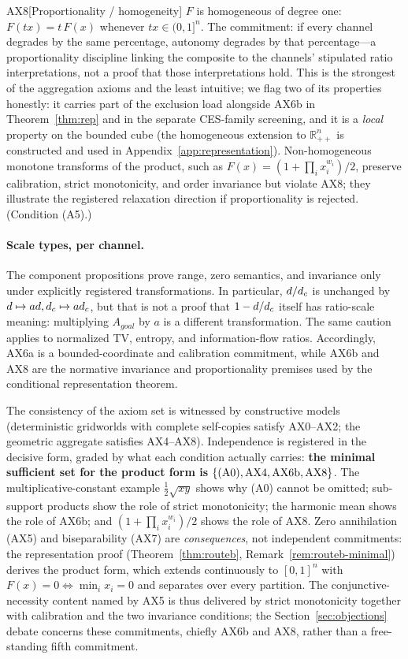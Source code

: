 \begin{axiom}{AX8}[Proportionality / homogeneity]\label{ax:8}
$F$ is homogeneous of degree one: $F(tx)=t\,F(x)$ whenever $tx\in(0,1]^n$. The
commitment: if every channel degrades by the same percentage, autonomy
degrades by that percentage---a proportionality discipline linking the
composite to the channels' stipulated ratio interpretations, not a proof
that those interpretations hold. This is the strongest of the
aggregation axioms and the least intuitive; we flag two of its properties
honestly: it carries part of the exclusion load alongside AX6b in
Theorem~\ref{thm:rep} and in the separate CES-family screening, and it is a
\emph{local} property on the bounded cube
(the homogeneous extension to $\mathbb{R}_{++}^n$ is constructed and used in
Appendix~\ref{app:representation}). Non-homogeneous monotone transforms of
the product, such as $F(x)=(1+\prod_ix_i^{w_i})/2$, preserve calibration,
strict monotonicity, and order invariance but violate AX8; they illustrate
the registered relaxation direction if proportionality is rejected.
(Condition (A5).)
\end{axiom}

\paragraph{Scale types, per channel.}
The component propositions prove range, zero semantics, and invariance only
under explicitly registered transformations. In particular, $d/d_{c}$ is
unchanged by $d\mapsto ad,d_{c}\mapsto ad_{c}$, but that is not a proof that
$1-d/d_{c}$ itself has ratio-scale meaning: multiplying $A_{goal}$ by $a$ is a
different transformation. The same caution applies to normalized TV, entropy,
and information-flow ratios. Accordingly, AX6a is a bounded-coordinate and
calibration commitment, while AX6b and AX8 are the normative invariance and
proportionality premises used by the conditional representation theorem.

The consistency of the axiom set is witnessed by constructive models
(deterministic gridworlds with complete self-copies satisfy AX0--AX2; the
geometric aggregate satisfies AX4--AX8). Independence is registered in the
decisive form, graded by what each condition actually carries: \textbf{the
minimal sufficient set for the product form is
$\{\textup{(A0)},\textup{AX4},\textup{AX6b},\textup{AX8}\}$}. The
multiplicative-constant example $\tfrac12\sqrt{xy}$ shows why (A0) cannot be
omitted; sub-support products show the role of strict monotonicity; the
harmonic mean shows the role of AX6b; and $(1+\prod_ix_i^{w_i})/2$ shows the
role of AX8. Zero annihilation (AX5) and biseparability (AX7) are
\emph{consequences}, not independent commitments: the representation proof
(Theorem~\ref{thm:routeb}, Remark~\ref{rem:routeb-minimal}) derives the
product form, which extends continuously to $[0,1]^n$ with
$F(x)=0\iff\min_ix_i=0$ and separates over every partition. The
conjunctive-necessity content named by AX5 is thus delivered by strict
monotonicity together with calibration and the two invariance conditions;
the Section~\ref{sec:objections} debate concerns these commitments, chiefly
AX6b and AX8, rather than a free-standing fifth commitment.


